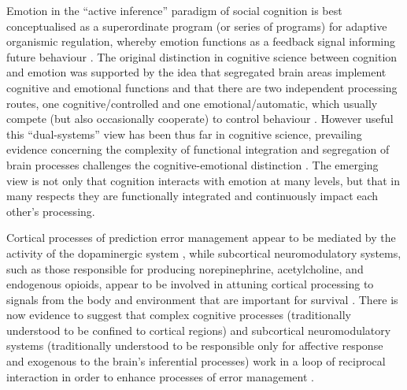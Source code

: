 \begin{CJK}{UTF8}{gbsn}
Emotion in the ``active inference'' paradigm of social cognition is best conceptualised as a superordinate program (or series of programs) for adaptive organismic regulation, whereby emotion functions as a feedback signal informing future behaviour \citep{Cosmides2000,Chetverikov2014,Chetverikov2015,Barrett2017}.  The original distinction in cognitive science between cognition and emotion was supported by the idea that segregated brain areas implement cognitive and emotional functions and that there are two independent processing routes, one cognitive/controlled and one emotional/automatic, which usually compete (but also occasionally cooperate) to control behaviour \citep{Kahneman2003}.  However useful this ``dual-systems'' view has been thus far in cognitive science, prevailing evidence concerning the complexity of functional integration and segregation of brain processes challenges the cognitive-emotional distinction \citep{Pessoa2013}.  The emerging view is not only that cognition interacts with emotion at many levels, but that in many respects they are functionally integrated and continuously impact each other's processing.

Cortical processes of prediction error management appear to be mediated by the activity of the dopaminergic system \citep{Schultz2016}, while subcortical neuromodulatory systems, such as those responsible for producing norepinephrine, acetylcholine, and endogenous opioids, appear to be involved in attuning cortical processing to signals from the body and environment that are important for survival \citep{Lewis2005}.  There is now evidence to suggest that complex cognitive processes (traditionally understood to be confined to cortical regions) and subcortical neuromodulatory systems (traditionally understood to be responsible only for affective response and exogenous to the brain's inferential processes) work in a loop of reciprocal interaction in order to enhance processes of error management \citep{Damasio1994,Lewis2005,Miller2017,Barrett2017}.



\end{CJK}
